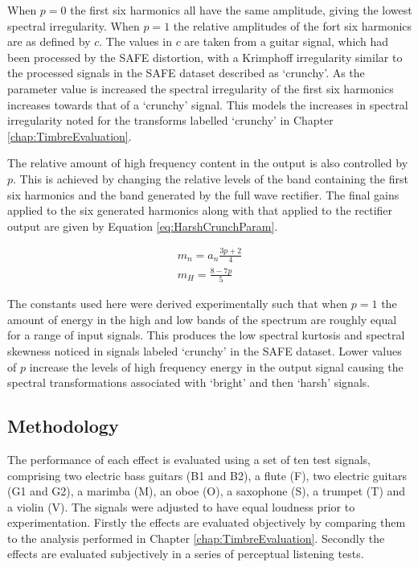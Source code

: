 			When $p = 0$ the first six harmonics all have the same amplitude, giving the lowest spectral
			irregularity. When $p = 1$ the relative amplitudes of the fort six harmonics are as defined by $c$.
			The values in $c$ are taken from a guitar signal, which had been processed by the SAFE distortion,
			with a Krimphoff irregularity similar to the processed signals in the SAFE dataset described as
			`crunchy'. As the parameter value is increased the spectral irregularity of the first six harmonics
			increases towards that of a `crunchy' signal. This models the increases in spectral irregularity
			noted for the transforms labelled `crunchy' in Chapter \ref{chap:TimbreEvaluation}.
			
			The relative amount of high frequency content in the output is also controlled by $p$. This is
			achieved by changing the relative levels of the band containing the first six harmonics and the
			band generated by the full wave rectifier. The final gains applied to the six generated harmonics
			along with that applied to the rectifier output are given by Equation \ref{eq:HarshCrunchParam}.

			\begin{gather}
				m_{n} = a_{n}\frac{3p + 2}{4} \nonumber \\
				m_{H} = \frac{8 - 7p}{5}
				\label{eq:HarshCrunchParam}
			\end{gather}

			The constants used here were derived experimentally such that when $p = 1$ the amount of energy in
			the high and low bands of the spectrum are roughly equal for a range of input signals. This
			produces the low spectral kurtosis and spectral skewness noticed in signals labeled `crunchy' in
			the SAFE dataset. Lower values of $p$ increase the levels of high frequency energy in the output
			signal causing the spectral transformations associated with `bright' and then `harsh' signals.

	\subsection{Methodology}
	\label{sec:PerceptualExperiments-SemanticControl-Methodology}
		The performance of each effect is evaluated using a set of ten test signals, comprising two electric bass
		guitars (B1 and B2), a flute (F), two electric guitars (G1 and G2), a marimba (M), an oboe (O), a saxophone
		(S), a trumpet (T) and a violin (V). The signals were adjusted to have equal loudness prior to
		experimentation.  Firstly the effects are evaluated objectively by comparing them to the analysis performed
		in Chapter \ref{chap:TimbreEvaluation}. Secondly the effects are evaluated subjectively in a series of
		perceptual listening tests.

